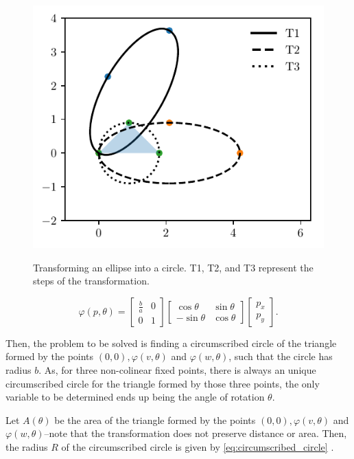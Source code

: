 \begin{figure}
	\centering
	\caption{Transforming an ellipse into a circle. T1, T2, and T3 represent the steps of the transformation.}
	\includegraphics{tex/figures/scripts/circumscribed-circle}
	\fautor
	\label{fig:circumscribed-circle}
\end{figure}
\begin{equation}\label{eq:trpnts}
\varphi(p, \theta)=\left[\begin{array}{cc}
\frac{b}{a}&0\\
0&1
\end{array}\right]
\left[\begin{array}{cc}
\cos{\theta}&\sin{\theta}\\
-\sin{\theta}&\cos{\theta}
\end{array}\right]\left[\begin{array}{c}
p_x\\
p_y
\end{array}\right].
\end{equation}

Then, the problem to be solved is finding a circumscribed circle of the triangle formed by the points $(0, 0), \varphi(v, \theta)$ and $\varphi(w, \theta)$, such that the circle has radius $b$. As, for three non-colinear fixed points, there is always an unique circumscribed circle for the triangle formed by those three points, the only variable to be determined ends up being the angle of rotation $\theta$.

Let $A(\theta)$ be the area of the triangle formed by the points $(0, 0), \varphi(v, \theta)$ and $\varphi(w, \theta)$--note that the transformation does not preserve distance or area. Then, the radius $R$ of the circumscribed circle is given by \autoref{eq:circumscribed_circle} \cite[p.~189]{johnson1960}.

